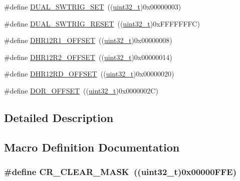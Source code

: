 \begin{DoxyCompactItemize}
\item 
\#define \hyperlink{group___d_a_c___private___defines_ga6401668f65168b2b689b49155f380bdd}{D\+U\+A\+L\+\_\+\+S\+W\+T\+R\+I\+G\+\_\+\+S\+ET}~((\hyperlink{_p_e___types_8h_a33594304e786b158f3fb30289278f5af}{uint32\+\_\+t})0x00000003)
\item 
\#define \hyperlink{group___d_a_c___private___defines_gacd3ce00f8b25892532af267f26932ed7}{D\+U\+A\+L\+\_\+\+S\+W\+T\+R\+I\+G\+\_\+\+R\+E\+S\+ET}~((\hyperlink{_p_e___types_8h_a33594304e786b158f3fb30289278f5af}{uint32\+\_\+t})0x\+F\+F\+F\+F\+F\+F\+F\+C)
\item 
\#define \hyperlink{group___d_a_c___private___defines_gaf1305e3b7cfb0f898678baeab6e91cbf}{D\+H\+R12\+R1\+\_\+\+O\+F\+F\+S\+ET}~((\hyperlink{_p_e___types_8h_a33594304e786b158f3fb30289278f5af}{uint32\+\_\+t})0x00000008)
\item 
\#define \hyperlink{group___d_a_c___private___defines_ga157b0fbccea090637eea09172fdd6a39}{D\+H\+R12\+R2\+\_\+\+O\+F\+F\+S\+ET}~((\hyperlink{_p_e___types_8h_a33594304e786b158f3fb30289278f5af}{uint32\+\_\+t})0x00000014)
\item 
\#define \hyperlink{group___d_a_c___private___defines_ga2893b0491ec29a95fd061e5e0fa029e3}{D\+H\+R12\+R\+D\+\_\+\+O\+F\+F\+S\+ET}~((\hyperlink{_p_e___types_8h_a33594304e786b158f3fb30289278f5af}{uint32\+\_\+t})0x00000020)
\item 
\#define \hyperlink{group___d_a_c___private___defines_ga051bab7263211bd232d13665339c1745}{D\+O\+R\+\_\+\+O\+F\+F\+S\+ET}~((\hyperlink{_p_e___types_8h_a33594304e786b158f3fb30289278f5af}{uint32\+\_\+t})0x0000002\+C)
\end{DoxyCompactItemize}


\subsection{Detailed Description}


\subsection{Macro Definition Documentation}
\subsubsection[{\texorpdfstring{C\+R\+\_\+\+C\+L\+E\+A\+R\+\_\+\+M\+A\+SK}{CR_CLEAR_MASK}}]{\setlength{\rightskip}{0pt plus 5cm}\#define C\+R\+\_\+\+C\+L\+E\+A\+R\+\_\+\+M\+A\+SK~(({\bf uint32\+\_\+t})0x00000\+F\+F\+E)}\hypertarget{group___d_a_c___private___defines_ga8a5812a1d5ced986bb997a4bb7ae697d}{}\label{group___d_a_c___private___defines_ga8a5812a1d5ced986bb997a4bb7ae697d}


